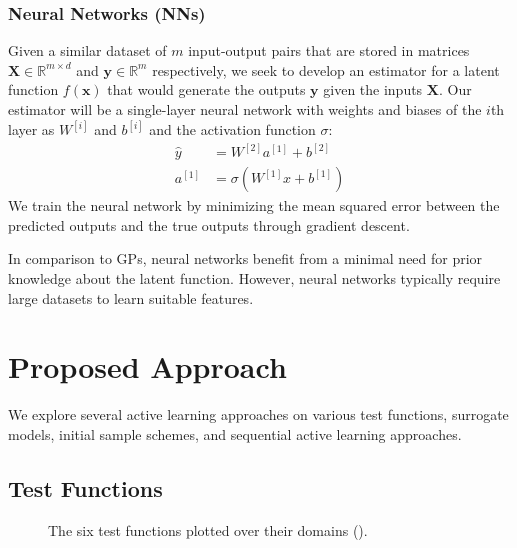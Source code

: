 \documentclass[conference,final]{IEEEtran}
\begin{document}
    \subsubsection{Neural Networks (NNs)}
    
    Given a similar dataset of $m$ input-output pairs that are stored in matrices $\mathbf{X} \in \mathbb{R}^{m \times d}$ and $\mathbf{y} \in \mathbb{R}^{m}$ respectively, we seek to develop an estimator for a latent function $f(\mathbf{x})$ that would generate the outputs $\mathbf{y}$ given the inputs $\mathbf{X}$. Our estimator will be a single-layer neural network with weights and biases of the $i$th layer as $W^{[i]}$ and $b^{[i]}$ and the activation function $\sigma$:
    \begin{align}
        \hat{y} &= W^{[2]}a^{[1]} + b^{[2]} \\
        a^{[1]} &= \sigma(W^{[1]}x + b^{[1]})
    \end{align}
    We train the neural network by minimizing the mean squared error between the predicted outputs and the true outputs through gradient descent.
    
    In comparison to GPs, neural networks benefit from a minimal need for prior knowledge about the latent function. However, neural networks typically require large datasets to learn suitable features. 
    
	\section{Proposed Approach}
	\label{sec:proposed-approach}
	
	We explore several active learning approaches on various test functions, surrogate models, initial sample schemes, and sequential active learning approaches.
	
	\subsection{Test Functions}
	
	\begin{figure*}[htbp]
	    \centering
	    
	    \caption{The six test functions plotted over their domains ().}
	    \label{fig:test_fns}
	\end{figure*}
	
\end{document}
